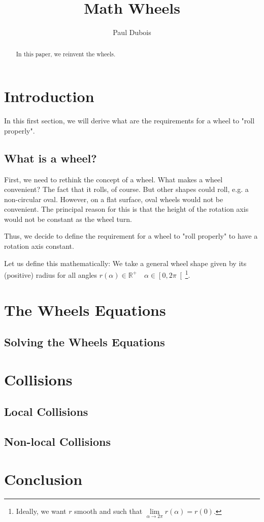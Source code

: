 \documentclass[]{article}
\title{Math Wheels}
\author{Paul Dubois}
\newcommand{\R}{\mathbb{R}}
\begin{document}
	
	\maketitle
	
	\begin{abstract}
		In this paper, we reinvent the wheels.
	\end{abstract}
	
	\section{Introduction}
	In this first section, we will derive what are the requirements for a wheel to "roll properly".
	
	\subsection{What is a wheel?}
	First, we need to rethink the concept of a wheel.
	What makes a wheel convenient? The fact that it rolls, of course. But other shapes could roll, e.g. a non-circular oval.
	However, on a flat surface, oval wheels would not be convenient.
	The principal reason for this is that the height of the rotation axis would not be constant as the wheel turn.
	
	Thus, we decide to define the requirement for a wheel to "roll properly" to have a rotation axis constant.
	
	Let us define this mathematically:
	We take a general wheel shape given by its (positive) radius for all angles $r(\alpha) \in \R^+ \quad \alpha \in \left[ 0, 2\pi \right[$\footnote{Ideally, we want $r$ smooth and such that $\lim\limits_{\alpha \to 2\pi} r(\alpha)=r(0)$.}.
	
	
	\section{The Wheels Equations}
	\subsection{Solving the Wheels Equations}
	
	\section{Collisions}
	\subsection{Local Collisions}
	\subsection{Non-local Collisions}
	
	\section{Conclusion}
	
\end{document}
